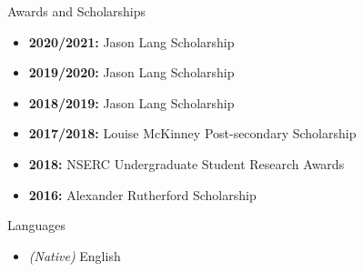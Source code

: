 \documentclass[]{mcdowellcv}
\begin{document}
\vspace*{-10pt}
\begin{cvsection}{Awards and Scholarships}
  \begin{cvsubsection}{}{}{}
    \begin{itemize}
      \item \textbf{2020/2021:} Jason Lang Scholarship
      \item \textbf{2019/2020:} Jason Lang Scholarship
      \item \textbf{2018/2019:} Jason Lang Scholarship
      \item \textbf{2017/2018:} Louise McKinney Post-secondary Scholarship 
      \item \textbf{2018:} NSERC Undergraduate Student Research Awards
      \item \textbf{2016:} Alexander Rutherford Scholarship
    \end{itemize}
  \end{cvsubsection}
\end{cvsection}
\newpage
\vspace*{-10pt}
\begin{cvsection}{Languages}
  \begin{cvsubsection}{}{}{}	
    \begin{itemize}
      \item \emph{(Native)} English  
    \end{itemize}
  \end{cvsubsection}
\end{cvsection}
\vspace*{-10pt}
\end{document}

